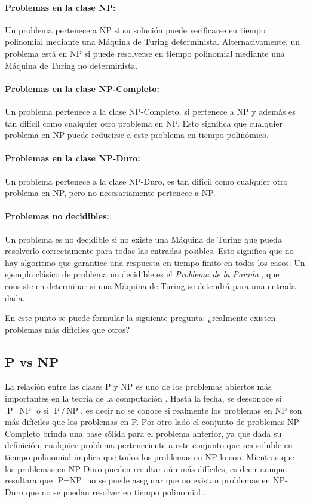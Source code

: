 \documentclass[12pt]{article}
\begin{document}
\paragraph{Problemas en la clase NP:}
Un problema pertenece a NP si su solución puede verificarse en tiempo polinomial mediante una Máquina de Turing determinista. Alternativamente, un problema está en NP si puede resolverse en tiempo polinomial mediante una Máquina de Turing no determinista.

\paragraph{Problemas en la clase NP-Completo:}
Un problema pertenece a la clase NP-Completo, si pertenece a NP y además es tan difícil como cualquier otro problema en NP. Esto significa que cualquier problema en NP puede reducirse a este problema en tiempo polinómico.

\paragraph{Problemas en la clase NP-Duro:}
Un problema pertenece a la clase NP-Duro, es tan difícil como cualquier otro problema en NP, pero no necesariamente 
pertenece a NP.  

\paragraph{Problemas no decidibles:}
Un problema es no decidible si no existe una Máquina de Turing que pueda resolverlo correctamente para todas las entradas posibles. Esto significa que no hay algoritmo que garantice una respuesta en tiempo finito en todos los casos. Un ejemplo clásico de problema no decidible es el \textit{Problema de la Parada} \cite{authomataTheory},
que consiste en determinar si una Máquina de Turing se detendrá para una entrada dada.

En este punto se puede formular la siguiente pregunta: ¿realmente existen problemas más difíciles que otros?
\subsection{P vs NP}

La relación entre las clases P y NP es uno de los problemas abiertos más importantes en la teoría de la
computación \cite{authomataTheory}. Hasta la fecha, se desconoce si $\text{P} = \text{NP}$ o si $\text{P} \neq \text{NP}$,
es decir no se conoce si realmente los problemas en NP son más difíciles que los problemas en P. Por otro
lado el conjunto de problemas NP-Completo brinda una base sólida para el problema anterior, ya que dada su
definición, cualquier problema perteneciente a este conjunto que sea soluble en tiempo polinomial
implica que todos los problemas en NP lo son. Mientras que los problemas en NP-Duro pueden resultar aún más
difíciles, es decir aunque resultara que $\text{P} = \text{NP}$ no se puede asegurar que no existan problemas 
en NP-Duro que no se puedan resolver en tiempo polinomial \cite{authomataTheory}.
\end{document}
